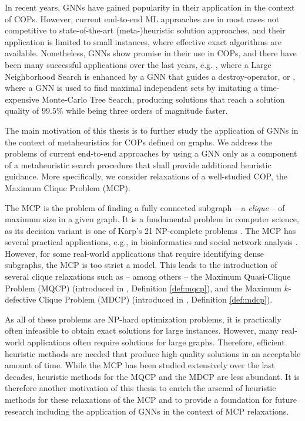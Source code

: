 \documentclass[draft,final]{vutinfth} %
\begin{document}
In recent years, GNNs have gained popularity in their application in the context of COPs. However, current end-to-end ML approaches are in most cases not competitive to state-of-the-art (meta-)heuristic solution approaches, and their application is limited to small instances, where effective exact algorithms are available. Nonetheless, GNNs show promise in their use in COPs, and there have been many successful applications over the last years, e.g. 
\cite{Oberweger2022}, where a Large Neighborhood Search is enhanced by a GNN that guides a destroy-operator, or \cite{NEURIPS2021_0db2e204}, where a GNN is used to find maximal independent sets by imitating a time-expensive Monte-Carlo Tree Search, producing solutions that reach a solution quality of $99.5\%$ while being three orders of magnitude faster. 

The main motivation of this thesis is to further study the application of GNNs in the context of metaheuristics for COPs defined on graphs. We address the problems of current end-to-end approaches by using a GNN only as a component of a metaheuristic search procedure that shall provide additional heuristic guidance. More specifically, we consider relaxations of a well-studied COP, the Maximum Clique Problem (MCP). 

The MCP is the problem of finding a fully connected subgraph -- a \textit{clique} -- of maximum size in a given graph. It is a fundamental problem in computer science, as its decision variant is one of Karp's 21 NP-complete problems \cite{Karp1972}. The MCP has several practical applications, e.g.,  in bioinformatics \cite{Dognin2010} and social network analysis \cite{Pattillo_network_analysis_2013}. However, for some real-world applications that require identifying dense subgraphs, the MCP is too strict a model. This leads to the introduction of several clique relaxations such as -- among others -- the Maximum Quasi-Clique Problem (MQCP) (introduced in \cite{Abello2002}, Definition \ref{def:mqcp}), and the Maximum $k$-defective Clique Problem (MDCP) (introduced in \cite{Yu2006}, Definition \ref{def:mdcp}). 

As all of these problems are NP-hard optimization problems, it is practically often infeasible to obtain exact solutions for large instances. However, many real-world applications often require solutions for large graphs. Therefore, efficient heuristic methods are needed that produce high quality solutions in an acceptable amount of time. While the MCP has been studied extensively over the last decades, heuristic methods for the MQCP and the MDCP are less abundant. It is therefore another motivation of this thesis to enrich the arsenal of heuristic methods for these relaxations of the MCP and to provide a foundation for future research including the application of GNNs in the context of MCP relaxations. 
\end{document}
